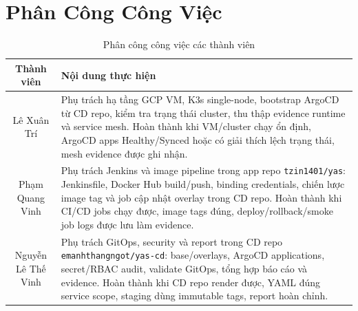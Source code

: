 \section{Phân Công Công Việc}

\begin{table}[H]
\centering
\caption{Phân công công việc các thành viên}
\begin{tabular}{|c|p{12cm}|}
\hline
\textbf{Thành viên} & \textbf{Nội dung thực hiện} \\
\hline
Lê Xuân Trí & Phụ trách hạ tầng GCP VM, K3s single-node, bootstrap ArgoCD từ CD repo, kiểm tra trạng thái cluster, thu thập evidence runtime và service mesh. Hoàn thành khi VM/cluster chạy ổn định, ArgoCD apps Healthy/Synced hoặc có giải thích lệch trạng thái, mesh evidence được ghi nhận. \\
\hline
Phạm Quang Vinh & Phụ trách Jenkins và image pipeline trong app repo \texttt{tzin1401/yas}: Jenkinsfile, Docker Hub build/push, binding credentials, chiến lược image tag và job cập nhật overlay trong CD repo. Hoàn thành khi CI/CD jobs chạy được, image tags đúng, deploy/rollback/smoke job logs được lưu làm evidence. \\
\hline
Nguyễn Lê Thế Vinh & Phụ trách GitOps, security và report trong CD repo \texttt{emanhthangngot/yas-cd}: base/overlays, ArgoCD applications, secret/RBAC audit, validate GitOps, tổng hợp báo cáo và evidence. Hoàn thành khi CD repo render được, YAML đúng service scope, staging dùng immutable tags, report hoàn chỉnh. \\
\hline
\end{tabular}
\end{table}
